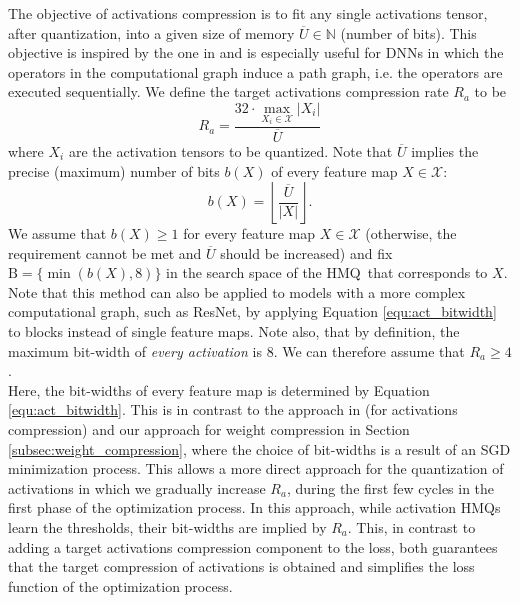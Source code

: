 \documentclass{article}
\newcommand{\bitset}{\mathrm{B}}
\newcommand{\qb}{HMQ}
\begin{document}
The objective of activations compression is to fit any single activations tensor, after quantization, into a given size of memory $\overline{U}\in\mathbb{N}$ (number of bits).
This objective is inspired by the one in \cite{Uhlich2020Mixed} and is especially useful for DNNs in which the operators in the computational graph induce a path graph, i.e. the operators are executed sequentially. 
We define the target activations compression rate $R_a$ to be
\begin{equation}\label{equ:target_activation_compression}
R_a=\frac{32\cdot\max_{X_i\in\mathcal{X}}|X_i|}{\overline{U}}
\end{equation}
where $X_i$ are the activation tensors to be quantized.
Note that $\overline{U}$ implies the precise (maximum) number of bits $b(X)$ of every feature map $X\in\mathcal{X}$:
\begin{equation}\label{equ:act_bitwidth}
b(X)=\left\lfloor \frac{\overline{U}}{|X|}\right\rfloor.
\end{equation}
We assume that $b(X)\geq 1$ for every feature map $X\in\mathcal{X}$ (otherwise, the requirement cannot be met and $\overline{U}$ should be increased) and fix $\bitset=\{\min(b(X), 8)\}$ in the search space of the \qb\ that corresponds to $X$.
Note that this method can also be applied to models with a more complex computational graph, such as ResNet, by applying Equation \ref{equ:act_bitwidth} to blocks instead of single feature maps.
Note also, that by definition, the maximum bit-width of \textit{every activation} is $8$.
We can therefore assume that $R_a\geq 4$.\\


Here, the bit-widths of every feature map is determined by Equation \ref{equ:act_bitwidth}.
This is in contrast to the approach in \cite{Uhlich2020Mixed} (for activations compression) and our approach for weight compression in Section \ref{subsec:weight_compression}, where the choice of bit-widths is a result of an SGD minimization process.
This allows a more direct approach for the quantization of activations in which we gradually increase $R_a$, during the first few cycles in the first phase of the optimization process.
In this approach, while activation \qb s learn the thresholds, their bit-widths are implied by $R_a$.
This, in contrast to adding a target activations compression component to the loss, both guarantees that the target compression of activations is obtained and simplifies the loss function of the optimization process.
\end{document}
